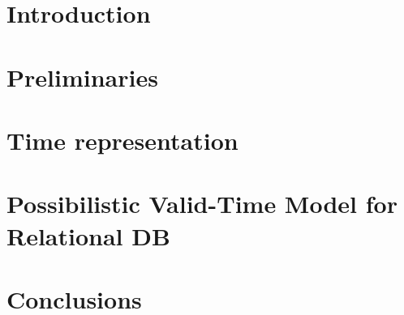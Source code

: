 \documentclass[11pt,twoside]{article}
\begin{document}
\vspace*{10pt}\textlineskip
\begin{multicols}{2}

\section{\label{sec:intro}Introduction}



\section{\label{sec:prelim}Preliminaries}




\section{\label{sec:time-rep}Time representation}


\section{\label{sec:temporal-model}Possibilistic Valid-Time Model for Relational DB}


\section{\label{sec:conclusions}Conclusions}



\end{multicols}
\end{document}
